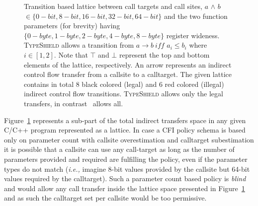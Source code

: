 \begin{figure}[h!]
{

}
\caption{Transition based lattice between call targets and call sites,
$a$ $\wedge$ $b$ $\in \{0-bit, 8-bit, 16-bit, 32-bit, 64-bit\}$ and the two 
function parameters (for brevity) having $\{0-byte, 1-byte, 2-byte, 4-byte, 8-byte\}$ register wideness. 
\textsc{TypeShield} allows a transition from $a \rightarrow b \ iff$ $a_{i} \le b_{i}$ where $i \in [1, 2]$.
Note that $\top$ and $\bot$ represent the top and bottom elements of the lattice, respectively.
An arrow represents an indirect control flow transfer from a callsite to a calltarget. 
The given lattice contains in total 8 black colored (legal) and 6 red colored (illegal) indirect control flow transitions. 
\textsc{TypeShield} allows only the legal transfers, in contrast~\cite{veen:typearmor} allows all.}
\label{fig:lattice3264}
\end{figure}

Figure~\ref{fig:lattice3264} represents a sub-part of the total indirect transfers space in any given C/C++ program represented as a lattice. 
In case a CFI policy schema is based only on parameter count with callsite overestimation and calltarget subestimation 
it is possible that a callsite can use any call-target as long as the number of 
parameters provided and required are fulfilling the policy, even if the parameter types do not match 
(\textit{i.e.,} imagine 8-bit values provided by the callsite but 64-bit values required by the calltarget). 
Such a parameter count based policy is \textit{blind} and would allow any call transfer 
inside the lattice space presented in Figure~\ref{fig:lattice3264} and as such the calltarget set per 
callsite would be too permissive.

